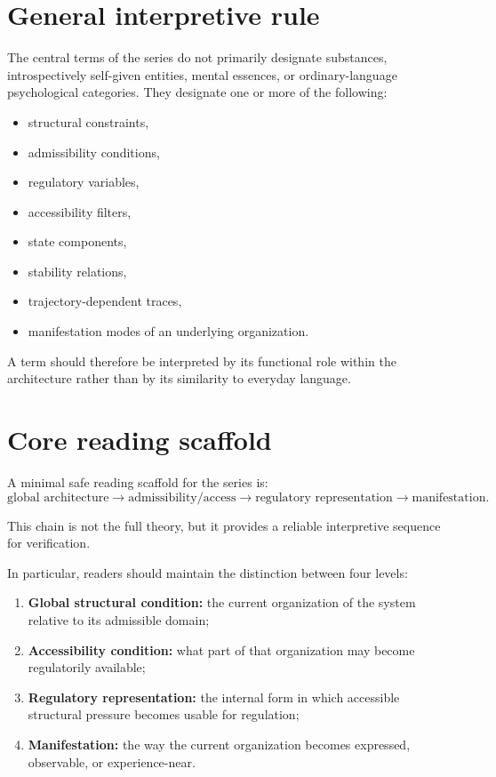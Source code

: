 \documentclass[11pt,a4paper]{article}
\begin{document}
	\section{General interpretive rule}
	
	The central terms of the series do not primarily designate substances, introspectively self-given entities, mental essences, or ordinary-language psychological categories. They designate one or more of the following:
	\begin{itemize}[leftmargin=2em]
		\item structural constraints,
		\item admissibility conditions,
		\item regulatory variables,
		\item accessibility filters,
		\item state components,
		\item stability relations,
		\item trajectory-dependent traces,
		\item manifestation modes of an underlying organization.
	\end{itemize}
	
	A term should therefore be interpreted by its functional role within the architecture rather than by its similarity to everyday language.
	
	\section{Core reading scaffold}
	
	A minimal safe reading scaffold for the series is:
	\[
	\text{global architecture} \rightarrow \text{admissibility/access} \rightarrow \text{regulatory representation} \rightarrow \text{manifestation}.
	\]
	
	This chain is not the full theory, but it provides a reliable interpretive sequence for verification.
	
	In particular, readers should maintain the distinction between four levels:
	\begin{enumerate}[leftmargin=2em]
		\item \textbf{Global structural condition:} the current organization of the system relative to its admissible domain;
		\item \textbf{Accessibility condition:} what part of that organization may become regulatorily available;
		\item \textbf{Regulatory representation:} the internal form in which accessible structural pressure becomes usable for regulation;
		\item \textbf{Manifestation:} the way the current organization becomes expressed, observable, or experience-near.
	\end{enumerate}
	
\end{document}
